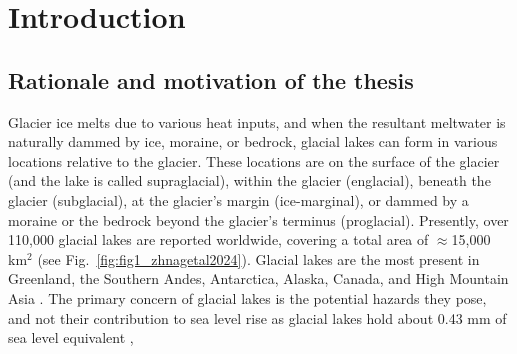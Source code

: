 \chapter{Introduction}
\label{ch:introduction}

\section{Rationale and motivation of the thesis}

Glacier ice melts due to various heat inputs, and when the resultant meltwater is naturally dammed by ice, moraine, or bedrock, glacial lakes can form in various locations relative to the glacier. These locations are on the surface of the glacier (and the lake is called supraglacial), within the glacier (englacial), beneath the glacier (subglacial), at the glacier's margin (ice-marginal), or dammed by a moraine or the bedrock beyond the glacier's terminus (proglacial). Presently, over 110,000 glacial lakes are reported worldwide, covering a total area of  $\approx$15,000 km$^2$ (see Fig.~\ref{fig:fig1_zhnagetal2024}). Glacial lakes are the most present in Greenland, the Southern Andes, Antarctica, Alaska, Canada, and High Mountain Asia \citep{Shugar&al2020}. The primary concern of glacial lakes is the potential hazards they pose, and not their contribution to sea level rise as glacial lakes hold about 0.43 mm of sea level equivalent \citep{Shugar&al2020}, 

